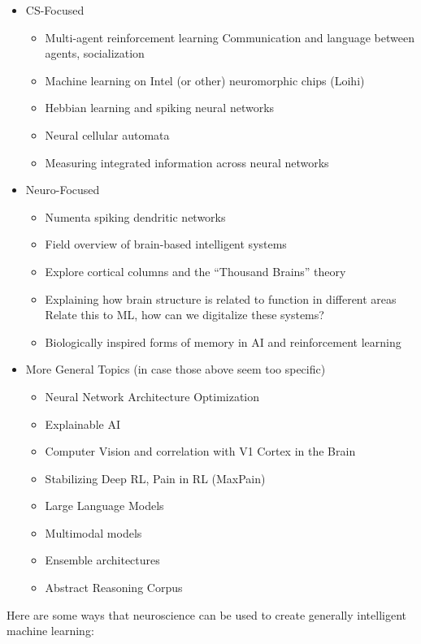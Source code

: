 \documentclass[letterpaper,11pt]{article}
\begin{document}
\begin{itemize}
  \item CS-Focused
  \begin{itemize}
    \item Multi-agent reinforcement learning
        Communication and language between agents, socialization
    \item Machine learning on Intel (or other) neuromorphic chips (Loihi)
    \item Hebbian learning and spiking neural networks
    \item Neural cellular automata
    \item Measuring integrated information across neural networks
  \end{itemize}

  \item Neuro-Focused
  \begin{itemize}
    \item Numenta spiking dendritic networks
    \item Field overview of brain-based intelligent systems
    \item Explore cortical columns and the “Thousand Brains” theory
    \item Explaining how brain structure is related to function in different areas
        Relate this to ML, how can we digitalize these systems?
    \item Biologically inspired forms of memory in AI and reinforcement learning
  \end{itemize}

  \item More General Topics (in case those above seem too specific)
  \begin{itemize}
    \item Neural Network Architecture Optimization
    \item Explainable AI
    \item Computer Vision and correlation with V1 Cortex in the Brain
    \item Stabilizing Deep RL, Pain in RL (MaxPain)
    \item Large Language Models
    \item Multimodal models
    \item Ensemble architectures
    \item Abstract Reasoning Corpus
  \end{itemize}
\end{itemize}
Here are some ways that neuroscience can be used to create generally intelligent machine learning:
\end{document}
